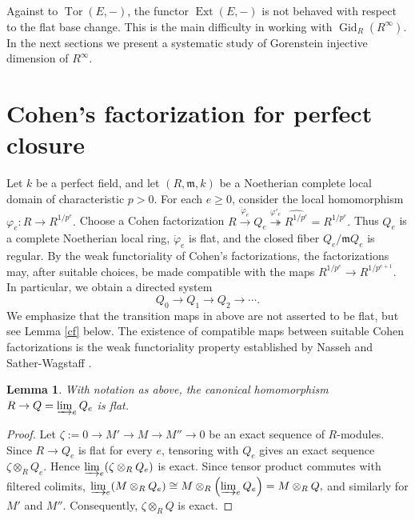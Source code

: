 \documentclass[11pt,a4paper]{amsart}
\numberwithin{equation}{section}
\newtheorem{lemma}[theorem]{Lemma}
\theoremstyle{definition}
\theoremstyle{remark}
\newcommand{\Ext}{\operatorname{Ext}}
\newcommand{\Tor}{\operatorname{Tor}}
\begin{document}
Against to $\Tor(E,-)$, the functor $\Ext(E,-)$ is not behaved with   respect to the flat base change. This is the main difficulty in working with $\operatorname{Gid}_R(R^\infty)$.
In the next sections we present a systematic study of Gorenstein injective dimension of $R^\infty$.

	\maketitle
	
\section{Cohen's factorization for perfect closure}

Let $k$ be a perfect field, and let $(R,\mathfrak m,k)$ be a Noetherian complete  local domain of
characteristic $p>0$. For each $e\geq 0$, consider the local homomorphism
$
\varphi_e:R\to R^{1/p^e}.
$
Choose a Cohen factorization
\(
R\xrightarrow{\dot\varphi_e}Q_e
\stackrel{\varphi'_e}\twoheadrightarrow\widehat{R^{1/p^e}}={R^{1/p^e}}.\)
Thus $Q_e$ is a complete Noetherian local ring,
$\dot\varphi_e$ is flat, and the closed fiber
$
Q_e/\mathfrak mQ_e
$
is regular.
By the weak functoriality of Cohen's factorizations, the
factorizations may, after suitable choices, be made compatible with
the maps
$
R^{1/p^e}\to R^{1/p^{e+1}}.
$
In particular, we obtain a directed system
\[
Q_0\longrightarrow Q_1\longrightarrow Q_2
\longrightarrow\cdots.
\]
We emphasize that the transition maps in above are not asserted to
be flat, but see {Lemma} \ref {cf} below.  The existence of compatible maps
between suitable Cohen factorizations is the weak functoriality
property established by Nasseh and Sather-Wagstaff \cite{sa}.


\begin{lemma}
	With notation as above, the canonical homomorphism
	$
	R\to  Q=\varinjlim_eQ_e
	$
	is flat.
\end{lemma}

\begin{proof}
	Let
	$
	\zeta:=	0\to M'\to M\to M''\to0
	$
	be an exact sequence of $R$-modules. Since $R\to Q_e$ is flat for
	every $e$, tensoring with $Q_e$ gives an exact sequence
	$
	\zeta\otimes_RQ_e
	.
	$
	Hence
	$
	\varinjlim_e(\zeta\otimes_RQ_e)	
	$
	is exact. Since tensor product commutes with filtered colimits,
	$
	\varinjlim_e(M\otimes_RQ_e)
	\cong
	M\otimes_R\left(\varinjlim_eQ_e\right)
	=M\otimes_RQ,
	$
	and similarly for $M'$ and $M''$. Consequently,
	\(
	\zeta\otimes_RQ
	\)
	is exact. 
\end{proof}
\end{document}
